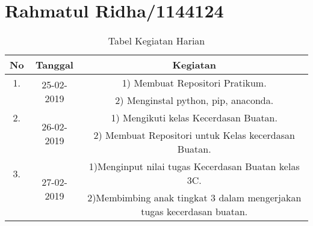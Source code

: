 \chapter{Rahmatul Ridha/1144124}

\begin{table}[h]
\caption{Tabel Kegiatan Harian}
\centering
\begin{tabular}{|c|c|c|}
\hline
No&Tanggal&Kegiatan\\
\hline
1.&\multirow{2}{*}{25-02-2019}&1) Membuat Repositori Pratikum.\\
&&2) Menginstal python, pip, anaconda.\\
\hline
2.&\multirow{2}{*}{26-02-2019}&1) Mengikuti kelas Kecerdasan Buatan.\\
&&2) Membuat Repositori untuk Kelas kecerdasan Buatan.\\
\hline
3.&\multirow{2}{*}{27-02-2019}&1)Menginput nilai tugas Kecerdasan Buatan kelas 3C.\\
&&2)Membimbing anak tingkat 3 dalam mengerjakan tugas kecerdasan buatan.\\
\hline
\end{tabular}
\label{table:contoh}
\end{table}
